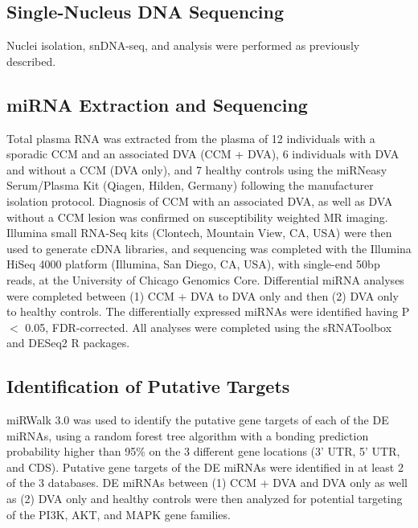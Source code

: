 \subsection{Single-Nucleus DNA Sequencing}
Nuclei isolation, snDNA-seq, and analysis were performed as previously described\citep{ren2021}. 

\subsection{miRNA Extraction and Sequencing}
Total plasma RNA was extracted from the plasma of 12 individuals with a sporadic CCM and an associated DVA (CCM + DVA), 6 individuals with DVA and without a CCM (DVA only), and 7 healthy controls using the miRNeasy Serum/Plasma Kit (Qiagen, Hilden, Germany) following the manufacturer isolation protocol. Diagnosis of CCM with an associated DVA, as well as DVA without a CCM lesion was confirmed on susceptibility weighted MR imaging. Illumina small RNA-Seq kits (Clontech, Mountain View, CA, USA) were then used to generate cDNA libraries, and sequencing was completed with the Illumina HiSeq 4000 platform (Illumina, San Diego, CA, USA), with single-end 50bp reads, at the University of Chicago Genomics Core. Differential miRNA analyses were completed between (1) CCM + DVA to DVA only and then (2) DVA only to healthy controls. The differentially expressed miRNAs were identified having P $<$ 0.05, FDR-corrected. All analyses were completed using the sRNAToolbox and DESeq2 R packages\citep{love2014, rueda2015}.

\subsection{Identification of Putative Targets}
miRWalk 3.0 was used to identify the putative gene targets of each of the DE miRNAs, using a random forest tree algorithm with a bonding prediction probability higher than 95\% on the 3 different gene locations (3' UTR, 5' UTR, and CDS)\citep{sticht2018}. Putative gene targets of the DE miRNAs were identified in at least 2 of the 3 databases. DE miRNAs between (1) CCM + DVA and DVA only as well as (2) DVA only and healthy controls were then analyzed for potential targeting of the PI3K, AKT, and MAPK gene families. 

